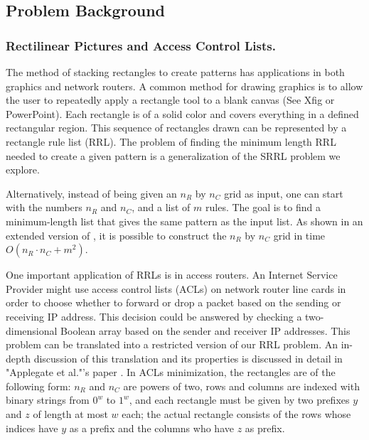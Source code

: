 \subsection{Problem Background}

\subsubsection{Rectilinear Pictures and Access Control Lists.}
The method of stacking rectangles to create patterns has applications in both graphics and network routers.
A common method for drawing graphics is to allow the user to repeatedly apply a rectangle tool to a blank canvas (See Xfig or PowerPoint).
Each rectangle is of a solid color and covers everything in a defined rectangular region.
This sequence of rectangles drawn can be represented by a rectangle rule list (RRL).
The problem of finding the minimum length RRL needed to create a given pattern is a generalization of the SRRL problem we explore.

Alternatively, instead of being given an $n_{R} $ by $n_{C}$ grid as input,
one can start with the numbers $n_{R}$ and $n_{C}$, and a list of $m$ rules.
The goal is to find a minimum-length list that gives the same pattern as the
input list. As shown in an extended version of \cite{ACJKLW07},
it is possible to
construct the $n_{R} $ by $n_{C}$ grid in time $O(n_R \cdot n_C + m^2)$.

One important application of RRLs is in access routers.
An Internet Service Provider might use access control lists (ACLs) on network router line cards in order to choose whether to forward or drop a packet based on the sending or receiving IP address.
This decision could be answered by checking a two-dimensional Boolean array based on the sender and receiver IP addresses.
This problem can be translated into a restricted version of our RRL problem.
An in-depth discussion of this translation and its properties is discussed in detail in "Applegate et al."'s paper \cite{ACJKLW07}.
In ACLs minimization, the rectangles are of the following form:
$n_R$ and $n_C$ are powers of two, rows and columns are
indexed with binary strings
from $0^w$ to $1^w$,  and each rectangle must be given by
two prefixes $y$ and $z$ of length at most $w$ each;
the actual rectangle consists of the rows whose indices have
 $y$ as a prefix and the columns who have $z$ as prefix.



